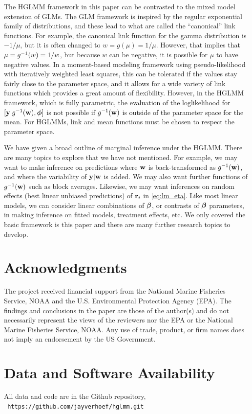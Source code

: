 \documentclass[12pt, titlepage]{article}
\begin{document}
The HGLMM framework in this paper can be contrasted to the mixed model extension of GLMs.  The GLM framework is inspired by the regular exponential family of distributions, and these lead to what are called the ``canonical'' link functions.  For example, the canonical link function for the gamma distribution is $-1/\mu$, but it is often changed to $w = g(\mu) = 1/\mu$.  However, that implies that $\mu = g^{-1}(w) = 1/w$, but because $w$ can be negative, it is possible for $\mu$ to have negative values.  In a moment-based modeling framework using pseudo-likelihood with iteratively weighted least squares, this can be tolerated if the values stay fairly close to the parameter space, and it allows for a wide variety of link functions which provides a great amount of flexibility.  However, in the HGLMM framework, which is fully parametric, the evaluation of the loglikelihood for $[\mathbf{y}|g^{-1}(\mathbf{w}),\boldsymbol{\phi}]$ is not possible if $g^{-1}(\mathbf{w})$ is outside of the parameter space for the mean.  For HGLMMs, link and mean functions must be chosen to respect the parameter space.

We have given a broad outline of marginal inference under the HGLMM.  There are many topics to explore that we have not mentioned.  For example, we may want to make inference on predictions where $\mathbf{w}$ is back-transformed as $g^{-1}(\mathbf{w})$, and where the variability of $\mathbf{y}|\mathbf{w}$ is added.  We may also want further functions of $g^{-1}(\mathbf{w})$ such as block averages.  Likewise, we may want inferences on random effects (best linear unbiased predictions) of $\mathbf{r}_{i}$ in \eqref{eq:lm_eta}.  Like most linear models, we can consider linear combinations of $\boldsymbol{\beta}$, or contrasts of $\boldsymbol{\beta}$ parameters, in making inference on fitted models, treatment effects, etc.  We only covered the basic framework is this paper and there are many further research topics to develop.

\section*{Acknowledgments}
The project received financial support from the National Marine Fisheries Service, NOAA and the U.S. Environmental Protection Agency (EPA).  The findings and conclusions in the paper are those of the author(s) and do not necessarily represent the views of the reviewers nor the EPA or the National Marine Fisheries Service, NOAA. Any use of trade, product, or firm names does not imply an endorsement by the US Government.

\section*{Data and Software Availability}
All data and code are in the Github repository, \\ \texttt{ https://github.com/jayverhoef/hglmm.git}
\end{document}
